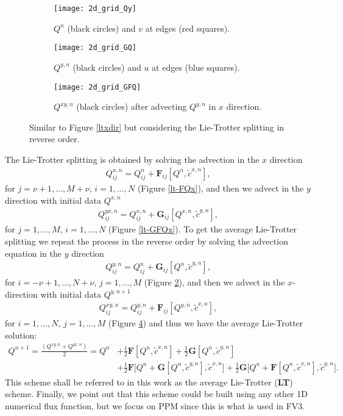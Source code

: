 \begin{figure}[!htb]
	\centering
	\begin{subfigure}{0.3\textwidth}
		\centering
		\texttt{[image: 2d\_grid\_Qy]}
		\caption{$Q^n$ (black circles) and $v$ at edges (red squares). \label{lt-Qy}}
	\end{subfigure}
	\begin{subfigure}{0.3\textwidth}
		\centering
		\texttt{[image: 2d\_grid\_GQ]}
		\caption{$Q^{y,n}$ (black circles) and $u$ at edges (blue squares).\label{lt-GQy} }
	\end{subfigure}
	\begin{subfigure}{0.3\textwidth}
		\centering
		\texttt{[image: 2d\_grid\_GFQ]}
		\caption{$Q^{xy,n}$ (black circles) after advecting $Q^{y,n}$ in $x$ direction. \label{lt-FGQy}}
	\end{subfigure}
	\caption{Similar to Figure \ref{ltxdir} but considering the Lie-Trotter splitting in reverse order.}
\end{figure}

The Lie-Trotter splitting is obtained by solving the advection in the $x$ direction
\begin{align*}
	{Q}^{x,n}_{ij} =  {Q}^{n}_{ij} + \mathbf{F}_{ij}[{Q^n}, \tilde{c}^{x,n}],
\end{align*}
for $j=\nu+1, \ldots, M+\nu$, $i=1, \ldots, N$ (Figure \ref{lt-FQx}), and then we advect in the $y$ direction with initial data ${Q}^{x,n}$ 
\begin{align*}
	{Q}^{yx,n}_{ij} = Q^{x,n}_{ij} + \mathbf{G}_{ij}[{Q}^{x,n},\tilde{c}^{y,n}],
\end{align*}
for $j=1, \ldots, M$,  $i=1, \ldots, N$  (Figure \ref{lt-GFQx}).
To get the average Lie-Trotter splitting we repeat the process in the reverse order by solving the advection equation
in the $y$ direction
\begin{align*}
	{Q}^{y,n}_{ij} =  {Q}^{n}_{ij} + \mathbf{G}_{ij}[{Q^n},\tilde{c}^{y,n}],
\end{align*}
for $i=-\nu+1, \ldots, N+\nu$, $j=1, \ldots, M$ (Figure \ref{lt-GQy}), and then we advect in the $x$-direction with initial data ${Q}^{y,n+1}$ 
\begin{align*}
	{Q}^{xy,n}_{ij} = Q^{y,n}_{ij} + \mathbf{F}_{ij}[Q^{y,n},\tilde{c}^{x,n}],
\end{align*}
for $i=1, \ldots, N$, $j=1, \ldots, M$ (Figure \ref{lt-FGQy}) and thus we have the average Lie-Trotter solution:
\begin{align}
\label{chp-adv2d-LT}
    Q^{n+1} = \frac{(Q^{xy,n} + Q^{yx,n})}{2} 
    = Q^n &+ \frac{1}{2}\mathbf{F}[Q^n,\tilde{c}^{x,n}] + \frac{1}{2}\mathbf{G}[Q^n,\tilde{c}^{y,n}] \nonumber \\
    &+\frac{1}{2}\mathbf{F}\bigg[Q^n + \mathbf{G}[Q^n, \tilde{c}^{y,n}], \tilde{c}^{x,n}\bigg]+
    \frac{1}{2}\mathbf{G}\bigg[Q^n + \mathbf{F}[Q^n, \tilde{c}^{x,n}], \tilde{c}^{y,n}\bigg].
\end{align}
This scheme shall be referred to in this work as the average Lie-Trotter (\textbf{LT}) scheme. 
Finally, we point out that this scheme could be built using any other 1D numerical flux function, 
but we focus on PPM since this is what is used in FV3.
